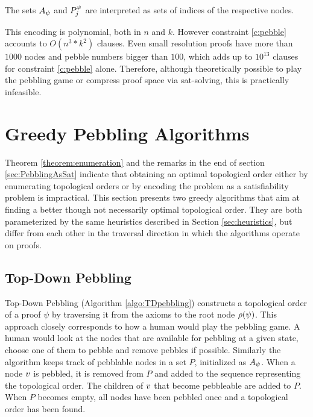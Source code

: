 \documentclass{llncs}
\begin{document}
The sets $A_{\psi}$ and $P_{j}^{\psi}$ are interpreted as sets of indices of the respective nodes.

\noindent
This encoding is polynomial, both in $n$ and $k$. However constraint \ref{c:pebble} accounts to $O(n^3*k^2)$ clauses. Even small resolution proofs have more than $1000$ nodes and pebble numbers bigger than $100$, which adds up to $10^{13}$ clauses for constraint \ref{c:pebble} alone. Therefore, although theoretically possible to play the pebbling game or compress proof space via sat-solving, this is practically infeasible.


\section{Greedy Pebbling Algorithms}
\label{section:algorithms}

Theorem \ref{theorem:enumeration} and the remarks in the end of section \ref{sec:PebblingAsSat} indicate that obtaining an optimal topological order either by enumerating topological orders or by encoding the problem as a satisfiability problem is impractical. This section presents two greedy algorithms that aim at finding a better though not necessarily optimal topological order. They are both parameterized by the same heuristics described in Section \ref{sec:heuristics}, but differ from each other in the traversal direction in which the algorithms operate on proofs.

\subsection{Top-Down Pebbling}

Top-Down Pebbling (Algorithm \ref{algo:TDpebbling}) constructs a topological order of a proof $\psi$ by traversing it from the axioms to the root node $\rho(\psi)$.
This approach closely corresponds to how a human would play the pebbling game. 
A human would look at the nodes that are available for pebbling at a given state, choose one of them to pebble and remove pebbles if possible.
Similarly the algorithm keeps track of pebblable nodes in a set $P$, initialized as $A_{\psi}$.
When a node $v$ is pebbled, it is removed from $P$ and added to the sequence representing the topological order. The children of $v$ that become pebbleable are added to $P$.
When $P$ becomes empty, all nodes have been pebbled once and a topological order has been found.
\end{document}
